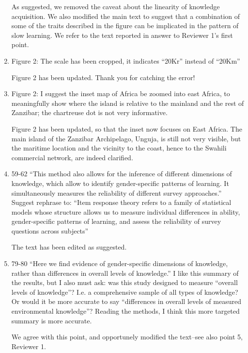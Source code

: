 \documentclass{article}
\newcommand{\comment}[1]{{\color{Blue}#1}}
\begin{document}
\begin{enumerate}
    \comment{As suggested, we removed the caveat about the linearity of knowledge acquisition. We also modified the main text to suggest that a combination of some of the traits described in the figure can be implicated in the pattern of slow learning. We refer to the text reported in answer to Reviewer 1's first point.}
    
    \item Figure 2: The scale has been cropped, it indicates “20Kr” instead of “20Km”
    
    \comment{Figure 2 has been updated. Thank you for catching the error!}

    \item Figure 2: I suggest the inset map of Africa be zoomed into east Africa, to meaningfully show where the island is relative to the mainland and the rest of Zanzibar; the chartreuse dot is not very informative.
    
    \comment{Figure 2 has been updated, so that the inset now focuses on East Africa. The main island of the Zanzibar Archipelago, Unguja, is still not very visible, but the maritime location and the vicinity to the coast, hence to the Swahili commercial network, are indeed clarified.  }

    \item59-62 “This method also allows for the inference of different dimensions of knowledge, which allow to identify gender-specific patterns of learning. It simultaneously measures the reliability of different survey approaches.” Suggest rephrase to: “Item response theory refers to a family of statistical models whose structure allows us to measure individual differences in ability, gender-specific patterns of learning, and assess the reliability of survey questions across subjects”
    
    \comment{The text has been edited as suggested. }


    \item 79-80 “Here we find evidence of gender-specific dimensions of knowledge, rather than differences in overall levels of knowledge.” I like this summary of the results, but I also must ask: was this study designed to measure “overall levels of knowledge”? I.e. a comprehensive sample of all types of knowledge? Or would it be more accurate to say “differences in overall levels of measured environmental knowledge”? Reading the methods, I think this more targeted summary is more accurate.
    
    \comment{We agree with this point, and opportunely modified the text--see also point 5, Reviewer 1.}
    

\end{enumerate}
\end{document}
